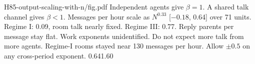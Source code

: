 {H85-output-scaling-with-n/fig.pdf}
{Independent agents give $\beta=1$. A shared talk channel gives $\beta<1$.}
{Messages per hour scale as $N^{0.33}$ [$-0.18$, 0.64] over 71 units. Regime I: 0.09, room talk nearly fixed. Regime III: 0.77. Reply parents per message stay flat. Work exponents unidentified.}
{Do not expect more talk from more agents. Regime-I rooms stayed near 130 messages per hour. Allow $\pm0.5$ on any cross-period exponent.}
{0.64}{1.60}
